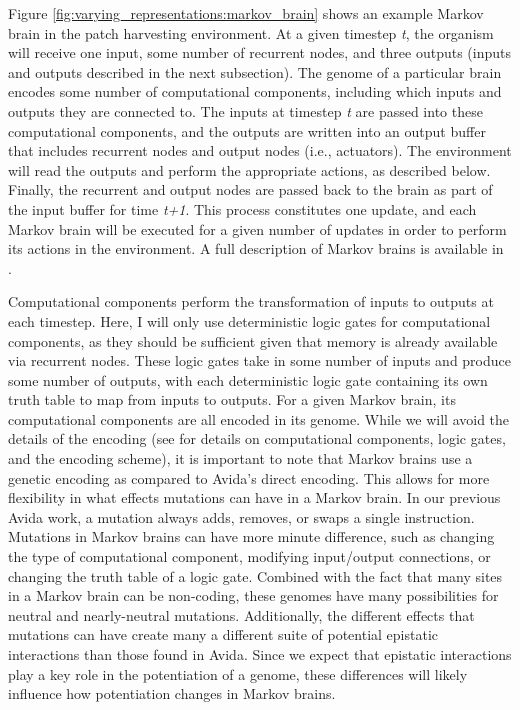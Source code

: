 Figure \ref{fig:varying_representations:markov_brain} shows an example Markov brain in the patch harvesting environment. 
At a given timestep \textit{t}, the organism will receive one input, some number of recurrent nodes, and three outputs (inputs and outputs described in the next subsection).
The genome of a particular brain encodes some number of computational components, including which inputs and outputs they are connected to. 
The inputs at timestep \textit{t} are passed into these computational components, and the outputs are written into an output buffer that includes recurrent nodes and output nodes (i.e., actuators). 
The environment will read the outputs and perform the appropriate actions, as described below. 
Finally, the recurrent and output nodes are passed back to the brain as part of the input buffer for time \textit{t+1}. 
This process constitutes one update, and each Markov brain will be executed for a given number of updates in order to perform its actions in the environment. 
A full description of Markov brains is available in \citep{hintzeMarkovBrainsTechnical2017}.

Computational components perform the transformation of inputs to outputs at each timestep. 
Here, I will only use deterministic logic gates for computational components, as they should be sufficient given that memory is already available via recurrent nodes. 
These logic gates take in some number of inputs and produce some number of outputs, with each deterministic logic gate containing its own truth table to map from inputs to outputs. 
For a given Markov brain, its computational components are all encoded in its genome. 
While we will avoid the details of the encoding (see \citep{hintzeMarkovBrainsTechnical2017} for details on computational components, logic gates, and the encoding scheme), it is important to note that Markov brains use a genetic encoding as compared to Avida's direct encoding. 
This allows for more flexibility in what effects mutations can have in a Markov brain. 
In our previous Avida work, a mutation always adds, removes, or swaps a single instruction. 
Mutations in Markov brains can have more minute difference, such as changing the type of computational component, modifying input/output connections, or changing the truth table of a logic gate. 
Combined with the fact that many sites in a Markov brain can be non-coding, these genomes have many possibilities for neutral and nearly-neutral mutations.
Additionally, the different effects that mutations can have create many a different suite of potential epistatic interactions than those found in Avida. 
Since we expect that epistatic interactions play a key role in the potentiation of a genome, these differences will likely influence how potentiation changes in Markov brains. 


